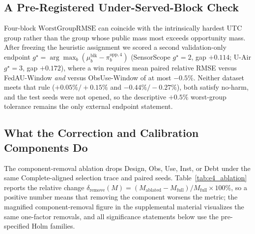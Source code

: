 \documentclass[letterpaper,journal]{IEEEtran}
\begin{document}
\subsection{A Pre-Registered Under-Served-Block Check}
\label{subsec:eval_underserved}

Four-block $\mathrm{WorstGroupRMSE}$ can coincide with the intrinsically hardest
UTC group rather than the group whose public mass most exceeds opportunity mass.
After freezing the heuristic assignment we scored a second validation-only
endpoint $g^{\star}=\arg\max_b(\mu^{\mathrm{blk}}_b-\pi^{\mathrm{opp},4}_b)$
(SensorScope $g^{\star}=2$, gap $+0.114$; U-Air $g^{\star}=3$, gap $+0.172$),
where a win requires mean paired relative RMSE versus FedAU-Window \emph{and}
versus ObsUse-Window of at most $-0.5\%$.  Neither dataset meets that rule
($+0.05\%/+0.15\%$ and $-0.44\%/-0.27\%$), both satisfy no-harm, and the test
seeds were not opened, so the descriptive $+0.5\%$ worst-group tolerance remains
the only external endpoint statement.

\subsection{What the Correction and Calibration Components Do}
\label{subsec:eval_rq3}

The component-removal ablation drops Design, Obs, Use, Inst, or Debt under the
same Complete-aligned selection trace and paired seeds.
Table~\ref{tab:e4_ablation} reports the relative change
$\delta_{\mathrm{remove}}(M)
=(M_{\mathrm{ablated}}-M_{\mathrm{full}})/M_{\mathrm{full}}\times100\%$,
so a positive number means that removing the component worsens the metric; the
magnified component-removal figure in the supplemental material visualizes the
same one-factor removals, and all significance statements below use the
pre-specified Holm families.
\end{document}
